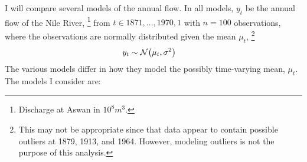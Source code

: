 I will compare several models of the annual flow.
In all models, $y_{t}$ be the annual flow of the Nile River,%
\footnote{Discharge at Aswan in $10^8 m^{3}$.} %
from $t \in 1871, ..., 1970, 1$ with $n = 100$ observations, 
where the observations are normally distributed given the mean $\mu_{t}$,%
\footnote{
  This may not be appropriate since that data appear to contain possible outliers at 1879, 1913, and 1964.
  However, modeling outliers is not the purpose of this analysis.
}
\begin{equation}
  \label{dlm:eq:10}
  \begin{aligned}[t]
    y_{t} &\sim \mathcal{N}\mathopen{}\left(\mu_{t}, \sigma^{2}\right)\mathclose{}
  \end{aligned}
\end{equation}
The various models differ in how they model the possibly time-varying mean, $\mu_{t}$.
The models I consider are:
